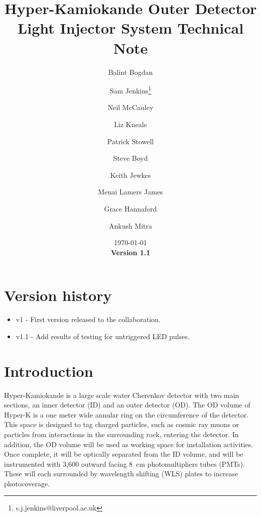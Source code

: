 \documentclass[a4paper,11pt]{article}
\begin{document}
\title{Hyper-Kamiokande Outer Detector Light Injector System Technical Note}
\author[1]{Balint Bogdan}
\author[1]{Sam Jenkins\footnote{s.j.jenkins@liverpool.ac.uk}}
\author[1]{Neil McCauley}
\author[2]{Liz Kneale}
\author[2]{Patrick Stowell}
\author[3]{Steve Boyd}
\author[3]{Keith Jewkes}
\author[3]{Menai Lamers James}
\author[3]{Grace Hannaford}
\author[3]{Ankush Mitra}

\date{\today\\
{\bf Version 1.1}}

\maketitle

\tableofcontents

\newpage

\section{Version history}
\begin{itemize}
\item v1 - First version released to the collaboration.
\item v1.1 - Add results of testing for untriggered LED pulses.
\end{itemize}

\newpage

\section{Introduction}
\label{sec:intro}

Hyper-Kamiokande is a large scale water Cherenkov detector with two main sections, an inner detector (ID) and an outer detector (OD). The OD volume of Hyper-K is a one meter wide annular ring on the circumference of the detector. This space is designed to tag charged particles, such as cosmic ray muons or particles from interactions in the surrounding rock, entering the detector. In addition, the OD volume will be used as working space for installation activities. Once complete, it will be optically separated from the ID volume, and will be instrumented with 3,600 outward facing 8~cm photomultipliers tubes (PMTs). These will each surrounded by wavelength shifting (WLS) plates to increase photocoverage.
\end{document}
